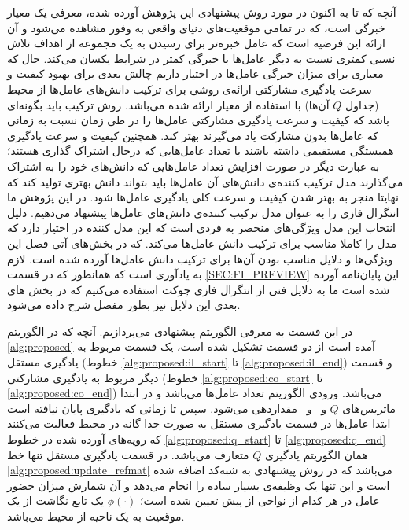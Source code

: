 آنچه که تا به اکنون در مورد روش پیشنهادی این پژوهش آورده شده، معرفی یک معیار خبرگی است، که در تمامی موقعیت‌های دنیای واقعی به وفور مشاهده می‌شود و آن ارائه این فرضیه است که عامل خبره‌تر برای رسیدن به یک مجموعه از اهداف تلاش نسبی کمتری نسبت به دیگر عامل‌ها با خبرگی کمتر در شرایط یکسان می‌کند. حال که معیاری برای میزان خبرگی عامل‌ها در اختیار داریم چالش بعدی برای بهبود کیفیت و سرعت یادگیری مشارکتی ارائه‌ی روشی برای ترکیب دانش‌های عامل‌ها از محیط (جداول $Q$ آن‌ها) با استفاده از معیار ارائه شده می‌باشد. روش ترکیب باید بگونه‌ای باشد که کیفیت و سرعت یادگیری مشارکتی عامل‌ها را در طی زمان نسبت به زمانی که عامل‌ها بدون مشارکت یاد می‌گیرند بهتر کند. همچنین کیفیت و سرعت یادگیری همبستگی مستقیمی داشته باشند با تعداد عامل‌هایی که درحال اشتراک گذاری هستند؛ به عبارت دیگر در صورت افزایش تعداد عامل‌هایی که دانش‌های خود را به اشتراک می‌گذارند مدل ترکیب کننده‌ی دانش‌های آن‌ عامل‌ها باید بتواند دانش‌ بهتری تولید کند که نهایتا منجر به بهتر شدن کیفیت و سرعت کلی یادگیری عامل‌ها شود.
در این پژوهش ما انتگرال فازی را به عنوان مدل ترکیب کننده‌ی دانش‌های عامل‌ها پیشنهاد می‌دهیم. دلیل انتخاب این مدل ویژگی‌های منحصر به فردی است که این مدل کننده در اختیار دارد که مدل را کاملا مناسب برای ترکیب دانش‌ عامل‌ها می‌کند. که در بخش‌های آتی فصل این ویژگی‌ها و دلایل مناسب بودن آن‌ها برای ترکیب دانش عامل‌ها آورده شده است. لازم به یاد‌آوری است که همانطور که در قسمت
\ref{SEC:FI_PREVIEW}
این پایان‌نامه آورده شده است ما به دلایل فنی از انتگرال فازی چوکت استفاده می‌کنیم که در بخش‌ های بعدی این دلایل نیز بطور مفصل شرح داده می‌شود.

در این قسمت به معرفی الگوریتم پیشنهادی می‌پردازیم. آنچه که در الگوریتم
\ref{alg:proposed}
آمده است از دو قسمت تشکیل شده است، یک قسمت مربوط به یادگیری مستقل (خطوط
\ref{alg:proposed:il_start} تا \ref{alg:proposed:il_end})
و قسمت دیگر مربوط به یادگیری مشارکتی (خطوط
\ref{alg:proposed:co_start} تا \ref{alg:proposed:co_end})
می‌باشد. ورودی الگوریتم تعداد عامل‌ها می‌باشد و در ابتدا ماتریس‌های $Q$ و \ و \ مقداردهی می‌شود. سپس تا زمانی که یادگیری پایان نیافته است ابتدا عامل‌ها در قسمت یادگیری مستقل به صورت جدا گانه در محیط فعالیت می‌کنند که رویه‌های آورده شده در خطوط
\ref{alg:proposed:q_start} تا \ref{alg:proposed:q_end}
همان الگوریتم یادگیری $Q$ متعارف می‌باشد. در قسمت یادگیری مستقل تنها خط
\ref{alg:proposed:update_refmat}
می‌باشد که در روش پیشنهادی به شبه‌کد اضافه شده است و این تنها یک وظیفه‌ی بسیار ساده را انجام می‌دهد و آن شمارش میزان حضور عامل در هر کدام از نواحی از پیش تعیین شده است؛ $\phi(\cdot)$ یک تابع نگاشت از یک موقعیت به یک ناحیه از محیط می‌باشد.

